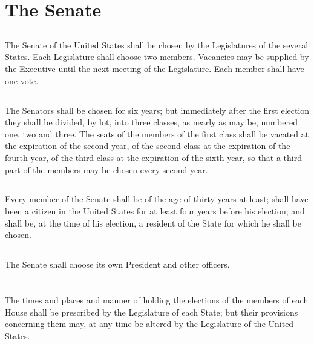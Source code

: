 \documentclass{constitution}
\begin{document}
\chapter{The Senate}
\section{}
The Senate of the United States shall be chosen by the Legislatures of the several States.
Each Legislature shall choose two members.
Vacancies may be supplied by the Executive until the next meeting of the Legislature.
Each member shall have one vote.

\section{}
The Senators shall be chosen for six years;
but immediately after the first election they shall be divided, by lot, into three classes, as nearly as may be, numbered one, two and three.
The seats of the members of the first class shall be vacated at the expiration of the second year,
of the second class at the expiration of the fourth year,
of the third class at the expiration of the sixth year,
so that a third part of the members may be chosen every second year.

\section{}
Every member of the Senate shall be of the age of thirty years at least;
shall have been a citizen in the United States for at least four years before his election;
and shall be, at the time of his election, a resident of the State for which he shall be chosen.

\section{}
The Senate shall choose its own President and other officers.

\chapter{}
\section{}
The times and places and manner of holding the elections of the members of each House shall be prescribed by the Legislature of each State;
but their provisions concerning them may, at any time be altered by the Legislature of the United States.
\end{document}
